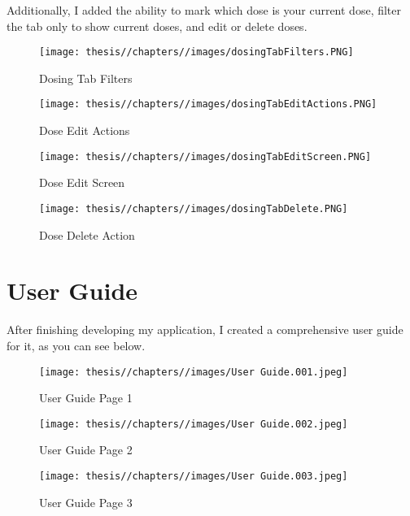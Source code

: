 Additionally, I added the ability to mark which dose is your current dose, filter the tab only to show current doses, and edit or delete doses.

\begin{figure} [H]
    \centering
    \texttt{[image: thesis//chapters//images/dosingTabFilters.PNG]}
    \caption{Dosing Tab Filters}
 
\end{figure}

\begin{figure} [H]
    \centering
    \texttt{[image: thesis//chapters//images/dosingTabEditActions.PNG]}
    \caption{Dose Edit Actions}
 
\end{figure}

\begin{figure} [H]
    \centering
    \texttt{[image: thesis//chapters//images/dosingTabEditScreen.PNG]}
    \caption{Dose Edit Screen}
 
\end{figure}

\begin{figure} [H]
    \centering
    \texttt{[image: thesis//chapters//images/dosingTabDelete.PNG]}
    \caption{Dose Delete Action}
 
\end{figure}

\section{User Guide}

After finishing developing my application, I created a comprehensive user guide for it, as you can see below.

\begin{figure} [H]
    \centering
    \texttt{[image: thesis//chapters//images/User Guide.001.jpeg]}
    \caption{User Guide Page 1}
 
\end{figure}

\begin{figure} [H]
    \centering
    \texttt{[image: thesis//chapters//images/User Guide.002.jpeg]}
    \caption{User Guide Page 2}
 
\end{figure}

\begin{figure} [H]
    \centering
    \texttt{[image: thesis//chapters//images/User Guide.003.jpeg]}
    \caption{User Guide Page 3}
 
\end{figure}

